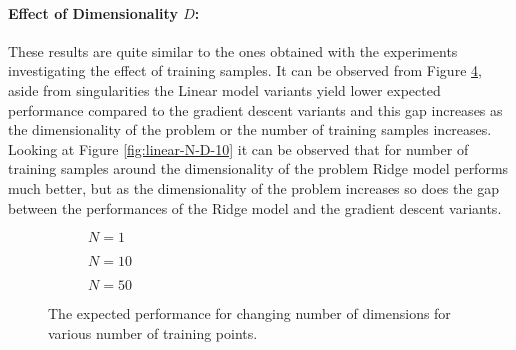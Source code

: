 \paragraph{Effect of Dimensionality $D$:} These results are quite similar to the ones obtained with the experiments investigating the effect of training samples. It can be observed from Figure \ref{fig:linear-D}, aside from singularities the Linear model variants yield lower expected performance compared to the gradient descent variants and this gap increases as the dimensionality of the problem or the number of training samples increases. Looking at Figure \ref{fig:linear-N-D-10} it can be observed that for number of training samples around the dimensionality of the problem Ridge model performs much better, but as the dimensionality of the problem increases so does the gap between the performances of the Ridge model and the gradient descent variants.

\begin{figure}[!h]
  \centering
    \begin{subfigure}{0.3\textwidth}
      \centering
      \caption{$N=1$}
      \label{fig:linear-D-N-1}
    \end{subfigure}
    \begin{subfigure}{0.3\textwidth}
      \centering
      \caption{$N=10$}
      \label{fig:linear-D-N-10}
    \end{subfigure}
    \begin{subfigure}{0.3\textwidth}
      \centering
      \caption{$N=50$}
      \label{fig:linear-D-N-50}
    \end{subfigure}
  \caption{The expected performance for changing number of dimensions for various number of training points.}\label{fig:linear-D}
\end{figure}


